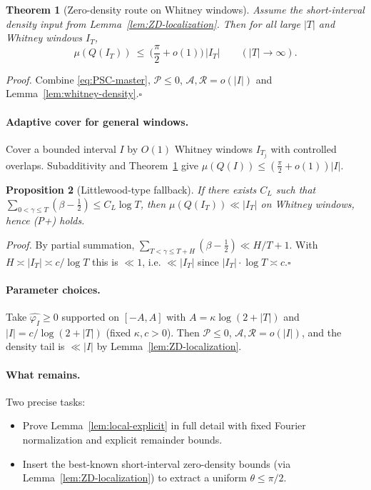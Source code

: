 \documentclass[11pt]{article}
\newtheorem{theorem}{Theorem}
\newtheorem{proposition}[theorem]{Proposition}
\theoremstyle{remark}
\begin{document}
\begin{theorem}[Zero-density route on Whitney windows]\label{thm:ZD-main}
Assume the short-interval density input from Lemma~\ref{lem:ZD-localization}. Then for all large \(|T|\) and Whitney windows \(I_T\),
\[
 \mu(Q(I_T))\ \le\ \Big(\frac{\pi}{2}+o(1)\Big)\,|I_T|\qquad (|T|\to\infty).
\]
\end{theorem}
\noindent\emph{Proof.} Combine \eqref{eq:PSC-master}, \(\mathcal P\le 0\), \(\mathcal A,\mathcal R=o(|I|)\) and Lemma~\ref{lem:whitney-density}.\hfill$\square$

\paragraph{Adaptive cover for general windows.}
Cover a bounded interval \(I\) by \(O(1)\) Whitney windows \(I_{T_j}\) with controlled overlaps. Subadditivity and Theorem~\ref{thm:ZD-main} give \(\mu(Q(I))\le (\tfrac{\pi}{2}+o(1))|I|\).

\begin{proposition}[Littlewood-type fallback]\label{prop:littlewood-route}
If there exists \(C_L\) such that \(\sum_{0<\gamma\le T}(\beta-\tfrac12)\le C_L\log T\), then \(\mu(Q(I_T))\ll |I_T|\) on Whitney windows, hence \emph{(P+)} holds.
\end{proposition}
\noindent\emph{Proof.} By partial summation, \(\sum_{T<\gamma\le T+H}(\beta-\tfrac12)\ll H/T+1\). With \(H\asymp |I_T|\asymp c/\log T\) this is \(\ll 1\), i.e. \(\ll |I_T|\) since \(|I_T|\cdot\log T\asymp c\).\hfill$\square$

\paragraph{Parameter choices.}
Take \(\widehat{\varphi_I}\ge 0\) supported on \([-A,A]\) with \(A=\kappa\log(2+|T|)\) and \(|I|=c/\log(2+|T|)\) (fixed \(\kappa,c>0\)). Then \(\mathcal P\le 0\), \(\mathcal A,\mathcal R=o(|I|)\), and the density tail is \(\ll |I|\) by Lemma~\ref{lem:ZD-localization}.

\paragraph{What remains.}
Two precise tasks:
\begin{itemize}
 \item Prove Lemma~\ref{lem:local-explicit} in full detail with fixed Fourier normalization and explicit remainder bounds.
 \item Insert the best-known short-interval zero-density bounds (via Lemma~\ref{lem:ZD-localization}) to extract a uniform \(\theta\le \pi/2\).
\end{itemize}
\end{document}
